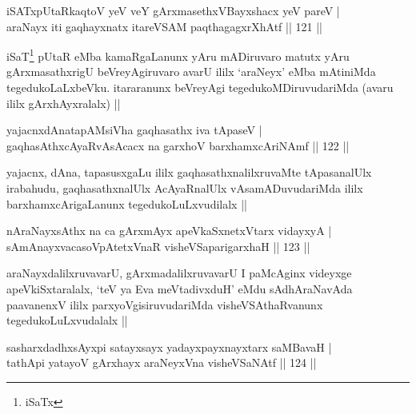 \begin{shl}
iSATxpUtaRkaqtoV yeV veY gArxmasethxVBayxshacx yeV pareV | \\
araNayx iti gaqhayxnatx itareVSAM paqthagagxrXhAtf \hfill|| 121 || 
\end{shl}

\begin{artha}
iSaT\footnote{iSaTx} pUtaR eMba kamaRgaLanunx yAru mADiruvaro
matutx yAru gArxmasathxrigU beVreyAgiruvaro avarU ililx `araNeyx' eMba
mAtiniMda tegedukoLaLxbeVku. itararanunx beVreyAgi
tegedukoMDiruvudariMda (avaru ililx gArxhAyxralalx) ||
\end{artha}


\begin{shl}
yajacnxdAnatapAMsiVha gaqhasathx iva tApaseV | \\
gaqhasAthxcAyaRvAsAcacx na garxhoV barxhamxcAriNAmf \hfill|| 122 || 
\end{shl}

\begin{artha}
yajacnx, dAna, tapasusxgaLu ililx gaqhasathxnalilxruvaMte tApasanalUlx
irabahudu, gaqhasathxnalUlx AcAyaRnalUlx vAsamADuvudariMda ililx
barxhamxcArigaLanunx tegedukoLuLxvudilalx ||
\end{artha}

\begin{shl}
nAraNayxsAthx na ca gArxmAyx apeVkaSxnetxV\s tarx vidayxyA | \\
sAmAnayxvacasoVpAtetxVnaR visheVSaparigarxhaH \hfill|| 123 || 
\end{shl}


\begin{artha}
araNayxdalilxruvavarU, gArxmadalilxruvavarU I paMcAginx videyxge
apeVkiSxtaralalx, `teV ya Eva meVtadivxduH' eMdu sAdhAraNavAda
paavanenxV ililx parxyoVgisiruvudariMda visheVSAthaRvanunx
tegedukoLuLxvudalalx ||
\end{artha}


\begin{shl}
sasharxdadhxsAyxpi satayxsayx yadayxpayxnayxtarx saMBavaH | \\
tathA\s pi yatayoV gArxhayx araNeyxVna visheVSaNAtf \hfill|| 124 || 
\end{shl}

